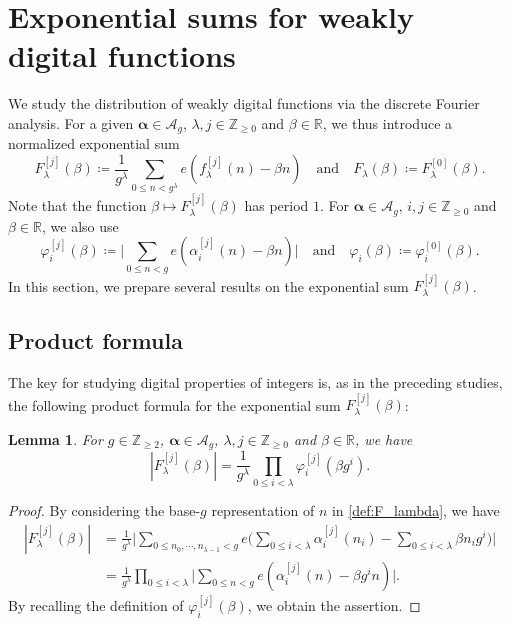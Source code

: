 \documentclass[hidelinks]{amsart}
\numberwithin{equation}{section}
\theoremstyle{plain}
\newtheorem{lemma}{Lemma}
\theoremstyle{definition}
\let\tmp\phi
\let\phi\varphi
\let\varphi\tmp
\let\tmp\epsilon
\let\epsilon\varepsilon
\let\varepsilon\tmp
\begin{document}
\section{Exponential sums for weakly digital functions}
\label{sec:exp_sum}
We study the distribution of weakly digital functions via the discrete Fourier analysis.
For a given $\bm{\alpha}\in\mathscr{A}_{g}$, $\lambda,j\in\mathbb{Z}_{\ge0}$ and $\beta\in\mathbb{R}$,
we thus introduce a normalized exponential sum
\begin{equation}
\label{def:F_lambda}
F_{\lambda}^{[j]}(\beta)
\coloneqq
\frac{1}{g^{\lambda}}
\sum_{0\le n<g^{\lambda}}
e(f_{\lambda}^{[j]}(n)-\beta n)
\quad\text{and}\quad
F_{\lambda}(\beta)
\coloneqq
F_{\lambda}^{[0]}(\beta).
\end{equation}
Note that the function
$\beta\mapsto F_{\lambda}^{[j]}(\beta)$
has period $1$.
For $\bm{\alpha}\in\mathscr{A}_{g}$, $i,j\in\mathbb{Z}_{\ge0}$ and $\beta\in\mathbb{R}$,
we also use
\[
\phi_{i}^{[j]}(\beta)
\coloneqq
\biggl|\sum_{0\le n<g}e(\alpha_{i}^{[j]}(n)-\beta n)\biggr|
\quad\text{and}\quad
\phi_{i}(\beta)
\coloneqq
\phi_{i}^{[0]}(\beta).
\]
In this section, we prepare several results on the exponential sum $F_{\lambda}^{[j]}(\beta)$.

\subsection{Product formula}
\label{subsec:product_formula}
The key for studying digital properties of integers is,
as in the preceding studies, the following product formula for the exponential sum $F_{\lambda}^{[j]}(\beta)$:
\begin{lemma}
\label{lem:F_product_formula}
For $g\in\mathbb{Z}_{\ge2}$,
$\bm{\alpha}\in\mathscr{A}_{g}$,
$\lambda,j\in\mathbb{Z}_{\ge0}$ and $\beta\in\mathbb{R}$, we have
\[
|F_{\lambda}^{[j]}(\beta)|
=
\frac{1}{g^{\lambda}}
\prod_{0\le i<\lambda}
\phi_{i}^{[j]}(\beta g^{i}).
\]
\end{lemma}
\begin{proof}
By considering the base-$g$ representation of $n$ in \cref{def:F_lambda}, we have
\begin{align}
|F_{\lambda}^{[j]}(\beta)|
&=
\frac{1}{g^{\lambda}}
\biggl|
\sum_{0\le n_{0},\cdots,n_{\lambda-1}<g}
e\biggl(\sum_{0\le i<\lambda}\alpha_{i}^{[j]}(n_{i})-\sum_{0\le i<\lambda}\beta n_{i}g^{i}\biggr)
\biggr|\\
&=
\frac{1}{g^{\lambda}}
\prod_{0\le i<\lambda}
\biggl|
\sum_{0\le n<g}
e(\alpha_{i}^{[j]}(n)-\beta g^{i}n)
\biggr|.
\end{align}
By recalling the definition of $\phi_{i}^{[j]}(\beta)$, we obtain the assertion.
\end{proof}
\end{document}
